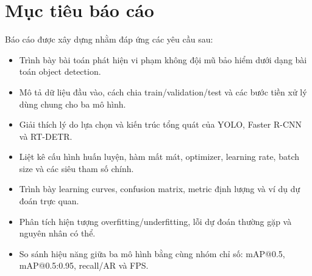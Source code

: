\section{Mục tiêu báo cáo}

Báo cáo được xây dựng nhằm đáp ứng các yêu cầu sau:

\begin{itemize}
    \item Trình bày bài toán phát hiện vi phạm không đội mũ bảo hiểm dưới dạng bài toán object detection.
    \item Mô tả dữ liệu đầu vào, cách chia train/validation/test và các bước tiền xử lý dùng chung cho ba mô hình.
    \item Giải thích lý do lựa chọn và kiến trúc tổng quát của YOLO, Faster R-CNN và RT-DETR.
    \item Liệt kê cấu hình huấn luyện, hàm mất mát, optimizer, learning rate, batch size và các siêu tham số chính.
    \item Trình bày learning curves, confusion matrix, metric định lượng và ví dụ dự đoán trực quan.
    \item Phân tích hiện tượng overfitting/underfitting, lỗi dự đoán thường gặp và nguyên nhân có thể.
    \item So sánh hiệu năng giữa ba mô hình bằng cùng nhóm chỉ số: mAP@0.5, mAP@0.5:0.95, recall/AR và FPS.
\end{itemize}
